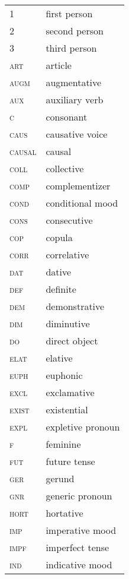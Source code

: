 

\begin{tabularx}{.45\textwidth}{ll} 
1& first person\\
2 & second person\\
3 & third person\\
\textsc{art} & article\\
\textsc{augm} & augmentative\\
\textsc{aux} & auxiliary verb\\
\textsc{c} & consonant\\
\textsc{caus} & causative voice\\
\textsc{causal} & causal\\
\textsc{coll} & collective\\
\textsc{comp} & complementizer\\
\textsc{cond} & conditional mood\\
\textsc{cons} & consecutive\\
\textsc{cop} & copula\\
\textsc{corr} & correlative\\
\textsc{dat} & dative\\
\textsc{def} & definite\\
\textsc{dem} & demonstrative\\
\textsc{dim} & diminutive\\
\textsc{do} & direct object\\
\textsc{elat} & elative\\
\textsc{euph} & euphonic\\
\textsc{excl} & exclamative\\
\textsc{exist} & existential\\
\textsc{expl} & expletive pronoun\\
\textsc{f} & feminine\\
\textsc{fut} & future tense\\
\textsc{ger} & gerund\\
\textsc{gnr} & generic pronoun\\
\textsc{hort} & hortative\\
\textsc{imp} & imperative mood\\
\textsc{impf} & imperfect tense\\
\textsc{ind} & indicative mood\\
\end{tabularx}
